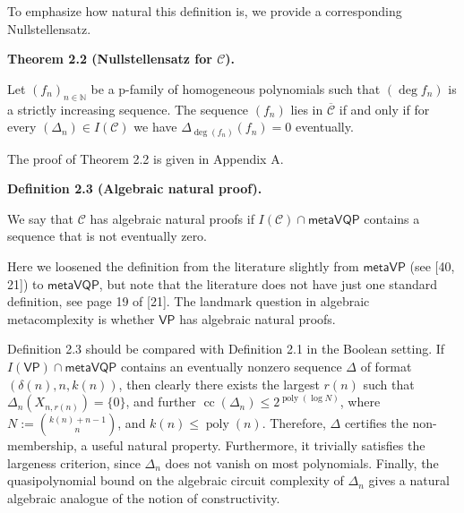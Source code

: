 To emphasize how natural this definition is, we provide a corresponding Nullstellensatz.





\par\medskip\noindent\textbf{Theorem 2.2 (Nullstellensatz for $\mathcal{C}$).}\par



Let $(f_{n})_{n\in\mathbb{N}}$ be a p-family of homogeneous polynomials such that $(\deg f_{n})$ is a strictly increasing sequence. The sequence $(f_{n})$ lies in $\overline{\mathcal{C}}$ if and only if for every $(\Delta_{n})\in I(\mathcal{C})$ we have $\Delta_{\deg(f_{n})}(f_{n})=0$ eventually.






The proof of Theorem 2.2 is given in Appendix A.





\par\medskip\noindent\textbf{Definition 2.3 (Algebraic natural proof).}\par



We say that $\mathcal{C}$ has algebraic natural proofs if $I(\mathcal{C})\mathop{\cap}\mathsf{metaVQP}$ contains a sequence that is not eventually zero.






Here we loosened the definition from the literature slightly from $\mathsf{metaVP}$ (see [40, 21]) to $\mathsf{metaVQP}$, but note that the literature does not have just one standard definition, see page 19 of [21].
The landmark question in algebraic metacomplexity is whether $\mathsf{VP}$ has algebraic natural proofs.





Definition 2.3 should be compared with Definition 2.1 in the Boolean setting. If $I(\mathsf{VP})\mathop{\cap}\mathsf{metaVQP}$ contains an eventually nonzero sequence $\Delta$ of format $(\delta(n),n,k(n))$, then clearly there exists the largest $r(n)$ such that $\Delta_{n}(X_{n,r(n)})=\{0\}$, and further $\operatorname{cc}(\Delta_{n})\leq 2^{\operatorname{poly}(\log N)}$, where $N:=\binom{k(n)+n-1}{n}$, and $k(n)\leq\operatorname{poly}(n)$. Therefore, $\Delta$ certifies the non-membership, a useful natural property. Furthermore, it trivially satisfies the largeness criterion, since $\Delta_{n}$ does not vanish on most polynomials. Finally, the quasipolynomial bound on the algebraic circuit complexity of $\Delta_{n}$ gives a natural algebraic analogue of the notion of constructivity.





